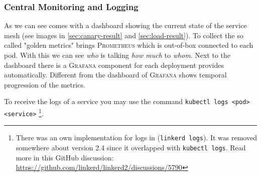 \subsubsection{Central Monitoring and Logging}
\label{sec:log-result}
As we can see \linkerd{} comes with a dashboard showing the current state of the service mesh (see images in \autoref{sec:canary-result} and \autoref{sec:load-result}).
To collect the so called "golden metrics" \linkerd{} brings \textsc{Prometheus} which is out-of-box connected to each pod.
With this we can see \textit{who} is talking \textit{how much} to \textit{whom}.
Next to the \linkerd{} dashboard there is a \textsc{Grafana} component for each deployment \linkerd{} provides automatically.
Different from the dashboard of \linkerd{} \textsc{Grafana} shows temporal progression of the metrics.

To receive the logs of a service you may use the \kubernetes{} command \lstinline|kubectl logs <pod> <service>|
	\footnote{
		There was an own implementation for logs in \linkerd{} (\lstinline|linkerd logs|). 
		It was removed somewhere about version 2.4 since it overlapped with \lstinline|kubectl logs|.
		Read more in this GitHub discussion:\\
		\url{https://github.com/linkerd/linkerd2/discussions/5790}
	}.

